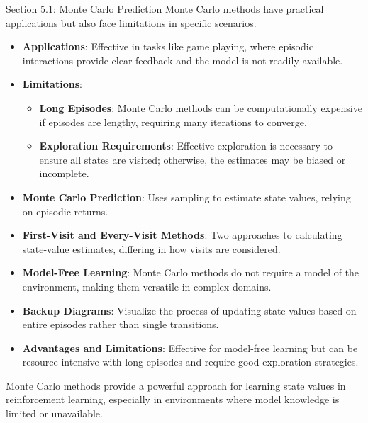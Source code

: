 \begin{notes}{Section 5.1: Monte Carlo Prediction}
    Monte Carlo methods have practical applications but also face limitations in specific scenarios.
    
    \begin{highlight}
    
        \begin{itemize}
            \item \textbf{Applications}: Effective in tasks like game playing, where episodic interactions provide clear feedback and the model is not readily available.
            \item \textbf{Limitations}: 
                \begin{itemize}
                    \item \textbf{Long Episodes}: Monte Carlo methods can be computationally expensive if episodes are lengthy, requiring many iterations to converge.
                    \item \textbf{Exploration Requirements}: Effective exploration is necessary to ensure all states are visited; otherwise, the estimates may be biased or incomplete.
                \end{itemize}
        \end{itemize}
    
    \end{highlight}
    
    \begin{highlight}
    
        \begin{itemize}
            \item \textbf{Monte Carlo Prediction}: Uses sampling to estimate state values, relying on episodic returns.
            \item \textbf{First-Visit and Every-Visit Methods}: Two approaches to calculating state-value estimates, differing in how visits are considered.
            \item \textbf{Model-Free Learning}: Monte Carlo methods do not require a model of the environment, making them versatile in complex domains.
            \item \textbf{Backup Diagrams}: Visualize the process of updating state values based on entire episodes rather than single transitions.
            \item \textbf{Advantages and Limitations}: Effective for model-free learning but can be resource-intensive with long episodes and require good exploration strategies.
        \end{itemize}
    
        Monte Carlo methods provide a powerful approach for learning state values in reinforcement learning, especially in environments where model knowledge is limited or unavailable.
    
    \end{highlight}
\end{notes}

